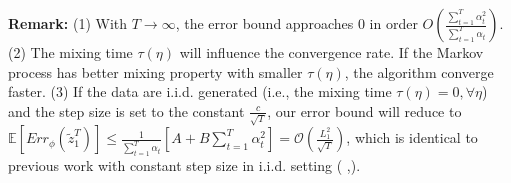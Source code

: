 \documentclass[twoside,11pt]{article}
\numberwithin{equation}{section}
\newcommand{\E}{\mathbb{E}}
\begin{document}
	\textbf{Remark:} (1) With $T\to\infty$, the error bound approaches $0$ in order $O(\frac{\sum_{t=1}^T \alpha_t^2}{\sum_{t=1}^T \alpha_t})$. (2) The mixing time $\tau(\eta)$ will influence the convergence rate. If the Markov process has better mixing property with smaller $\tau(\eta)$, the algorithm converge faster. (3) If the data are i.i.d. generated (i.e., the mixing time $ \tau(\eta) =0, \forall \eta$) and the step size is set to the constant $\frac{c}{\sqrt{T}} $, our error bound will reduce to  $ \E[Err_\phi(\tilde{z}_1^T)] 
	\le 		\frac{1}{\sum_{t=1}^{T}\alpha_t} \left[ A    + B \sum_{t=1}^{T}\alpha_t^2  \right]= \mathcal{O}(\frac{L_1^2}{\sqrt{T}})$, which is identical to previous work with constant step size in i.i.d. setting ( \cite{liu2015finite},\cite{nemirovski2009robust}).
	
	
	
\end{document}
